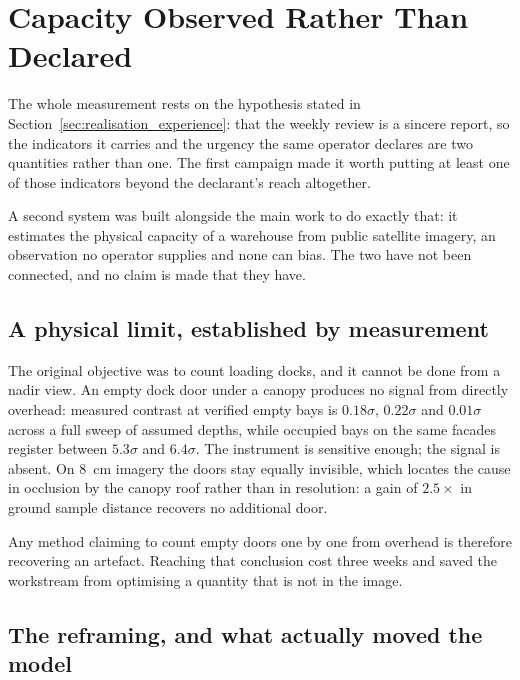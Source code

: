 
\section{Capacity Observed Rather Than Declared}
\label{app:imagerie}

The whole measurement rests on the hypothesis stated in
Section~\ref{sec:realisation_experience}: that the weekly review is a sincere report, so the
indicators it carries and the urgency the same operator declares are two quantities rather
than one. The first campaign made it worth putting at least one of those indicators beyond
the declarant's reach altogether.

A second system was built alongside the main work to do exactly that: it
estimates the physical capacity of a warehouse from public satellite imagery, an observation
no operator supplies and none can bias. The two have not been connected, and no claim is made
that they have.

\subsection*{A physical limit, established by measurement}

The original objective was to count loading docks, and it cannot be done from a nadir view.
An empty dock door under a canopy produces no signal from directly overhead: measured contrast
at verified empty bays is $0.18\sigma$, $0.22\sigma$ and $0.01\sigma$ across a full sweep of
assumed depths, while occupied bays on the same facades register between $5.3\sigma$ and
$6.4\sigma$. The instrument is sensitive enough; the signal is absent. On 8~cm imagery the
doors stay equally invisible, which locates the cause in occlusion by the canopy roof rather
than in resolution: a gain of $2.5\times$ in ground sample distance recovers no additional
door.

Any method claiming to count empty doors one by one from overhead is therefore recovering an
artefact. Reaching that conclusion cost three weeks and saved the workstream from optimising a
quantity that is not in the image.

\subsection*{The reframing, and what actually moved the model}

